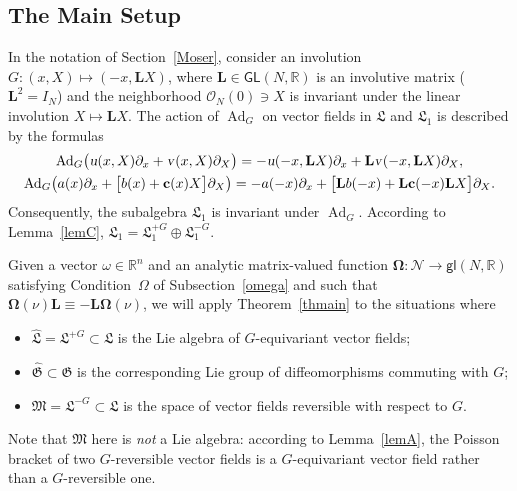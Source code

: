 \documentclass[12pt,reqno]{amsart}
\theoremstyle{definition}
\begin{document}
\subsection{The Main Setup}\label{setup}

In the notation of Section~\ref{Moser}, consider an involution
$G:(x,X)\mapsto(-x,{\mathbf L} X)$, where ${\mathbf L}\in{\mathsf{GL}}(N,{\mathbb R})$ is an involutive matrix
(${\mathbf L}^2=I_N$) and the neighborhood ${\mathcal O}_N(0)\ni X$ is invariant under the
linear involution $X\mapsto{\mathbf L} X$. The action of $\operatorname{Ad}_G$ on vector fields in
${\mathfrak L}$ and ${\mathfrak L}_1$ is described by the formulas
\begin{gather}
\operatorname{Ad}_G\bigl( {\text{\textsl{u}}}(x,X)\partial_x+{\text{\textsl{v}}}(x,X)\partial_X \bigr) =
-{\text{\textsl{u}}}(-x,{\mathbf L} X)\partial_x+{\mathbf L}{\text{\textsl{v}}}(-x,{\mathbf L} X)\partial_X,
\label{eqbig} \\
\operatorname{Ad}_G\bigl( a(x)\partial_x+\bigl[b(x)+{\mathbf c}(x)X\bigr]\partial_X \bigr) =
-a(-x)\partial_x+\bigl[{\mathbf L} b(-x)+{\mathbf L}{\mathbf c}(-x){\mathbf L} X\bigr]\partial_X.
\label{eqsmall}
\end{gather}
Consequently, the subalgebra ${\mathfrak L}_1$ is invariant under $\operatorname{Ad}_G$. According to
Lemma~\ref{lemC}, ${\mathfrak L}_1={\mathfrak L}_1^{+G}\oplus{\mathfrak L}_1^{-G}$.

Given a vector $\omega\in{\mathbb R}^n$ and an analytic matrix-valued function
${\mathbf{\Omega}}:{\mathcal N}\to{\mathsf{gl}}(N,{\mathbb R})$ satisfying Condition~$\Omega$ of
Subsection~\ref{omega} and such that ${\mathbf{\Omega}}(\nu){\mathbf L}\equiv-{\mathbf L}{\mathbf{\Omega}}(\nu)$,
we will apply Theorem~\ref{thmain} to the situations where
\begin{itemize}
\item ${\widehat{\mathfrak L}}={\mathfrak L}^{+G}\subset{\mathfrak L}$ is the Lie algebra of $G$-equivariant vector
fields;
\item ${\widehat{\mathfrak G}}\subset{\mathfrak G}$ is the corresponding Lie group of diffeomorphisms
commuting with $G$;
\item ${\mathfrak M}={\mathfrak L}^{-G}\subset{\mathfrak L}$ is the space of vector fields reversible with
respect to $G$.
\end{itemize}
Note that ${\mathfrak M}$ here is \emph{not} a Lie algebra: according to
Lemma~\ref{lemA}, the Poisson bracket of two $G$-reversible vector fields
is a $G$-equivariant vector field rather than a $G$-reversible one.
\end{document}
